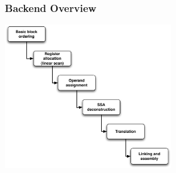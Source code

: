 \begin{frame}
\frametitle{\bf Backend Overview}

\begin{center}
\includegraphics[height=2.5in]{images/backend}
\end{center}
\end{frame}

% 

